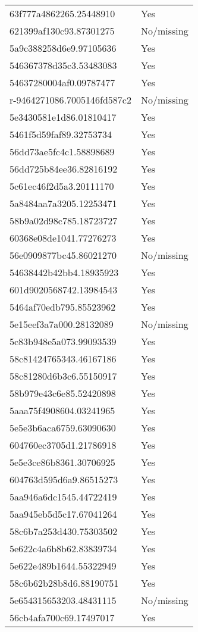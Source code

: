 \begin{tabular}{ll}
63f777a4862265.25448910 & Yes \\
621399af130c93.87301275 & No/missing \\
5a9c388258d6e9.97105636 & Yes \\
546367378d35c3.53483083 & Yes \\
54637280004af0.09787477 & Yes \\
r-9464271086.7005146fd587c2 & No/missing \\
5e3430581e1d86.01810417 & Yes \\
5461f5d59faf89.32753734 & Yes \\
56dd73ae5fc4c1.58898689 & Yes \\
56dd725b84ee36.82816192 & Yes \\
5c61ec46f2d5a3.20111170 & Yes \\
5a8484aa7a3205.12253471 & Yes \\
58b9a02d98c785.18723727 & Yes \\
60368e08de1041.77276273 & Yes \\
56e0909877bc45.86021270 & No/missing \\
54638442b42bb4.18935923 & Yes \\
601d9020568742.13984543 & Yes \\
5464af70edb795.85523962 & Yes \\
5e15eef3a7a000.28132089 & No/missing \\
5c83b948e5a073.99093539 & Yes \\
58c81424765343.46167186 & Yes \\
58c81280d6b3c6.55150917 & Yes \\
58b979e43c6e85.52420898 & Yes \\
5aaa75f4908604.03241965 & Yes \\
5e5e3b6aca6759.63090630 & Yes \\
604760ec3705d1.21786918 & Yes \\
5e5e3ce86b8361.30706925 & Yes \\
604763d595d6a9.86515273 & Yes \\
5aa946a6dc1545.44722419 & Yes \\
5aa945eb5d5c17.67041264 & Yes \\
58c6b7a253d430.75303502 & Yes \\
5e622c4a6b8b62.83839734 & Yes \\
5e622e489b1644.55322949 & Yes \\
58c6b62b28b8d6.88190751 & Yes \\
5e654315653203.48431115 & No/missing \\
56cb4afa700c69.17497017 & Yes \\

\end{tabular}
